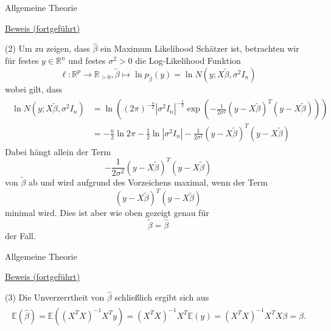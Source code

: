 \documentclass[
  8pt,
  ignorenonframetext,
]{beamer}
\begin{document}
\begin{frame}{Allgemeine Theorie}
\protect\hypertarget{allgemeine-theorie-3}{}
\footnotesize

\underline{Beweis (fortgeführt)}

\noindent (2) Um zu zeigen, dass \(\hat{\beta}\) ein Maximum Likelihood
Schätzer ist, betrachten wir für festes \(y \in \mathbb{R}^n\) und
festes \(\sigma^2 > 0\) die Log-Likelihood Funktion \begin{equation}
\ell : \mathbb{R}^p \to \mathbb{R}_{>0}, \tilde{\beta} \mapsto \ln p_{\tilde{\beta}}(y) = \ln N(y;X\tilde{\beta}, \sigma^2I_n)
\end{equation} wobei gilt, dass \begin{align}
\begin{split}
\ln N(y;X\tilde{\beta}, \sigma^2I_n)
& = \ln\left((2\pi)^{-\frac{n}{2}}|\sigma^2I_n|^{-\frac{1}{2}}\exp\left(-\frac{1}{2\sigma^2}(y - X\tilde{\beta})^T(y - X\tilde{\beta})\right)\right) \\
& = -\frac{n}{2} \ln 2\pi - \frac{1}{2} \ln |\sigma^2I_n| - \frac{1}{2\sigma^2}(y - X\tilde{\beta})^T(y - X\tilde{\beta})
\end{split}
\end{align} Dabei hängt allein der Term \begin{equation}
- \frac{1}{2\sigma^2}(y - X\tilde{\beta})^T(y - X\tilde{\beta})
\end{equation} von \(\tilde{\beta}\) ab und wird aufgrund des
Vorzeichens maximal, wenn der Term \begin{equation}
(y - X\tilde{\beta})^T(y - X\tilde{\beta})
\end{equation} minimal wird. Dies ist aber wie oben gezeigt genau für
\begin{equation}
\tilde{\beta} = \hat{\beta}
\end{equation} der Fall.
\end{frame}

\begin{frame}{Allgemeine Theorie}
\protect\hypertarget{allgemeine-theorie-4}{}
\footnotesize

\underline{Beweis (fortgeführt)}

\noindent (3) Die Unverzerrtheit von \(\hat{\beta}\) schließlich ergibt
sich aus \begin{align}
\begin{split}
\mathbb{E}(\hat{\beta}) 
= \mathbb{E}\left((X^TX)^{-1}X^Ty\right) 
= (X^TX)^{-1}X^T\mathbb{E}(y) 
= (X^TX)^{-1}X^TX\beta 
= \beta.
\end{split}
\end{align}
\end{frame}
\end{document}
